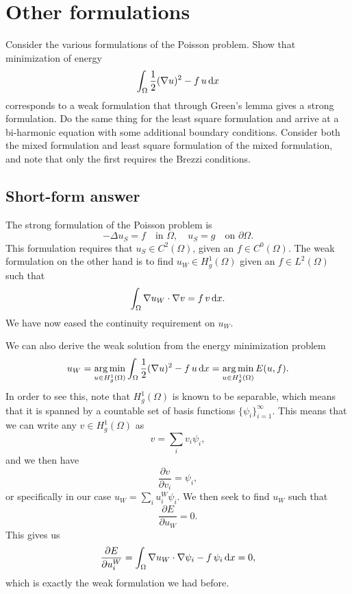 \section{Other formulations}
Consider the various formulations of the Poisson problem.
Show that minimization of energy
\begin{equation}
    \int_\Omega \frac{1}{2}(\nabla u)^2 - f \, u \mathop{}\!\mathrm{d} x
\end{equation}
corresponds to a weak formulation that through Green's lemma gives a strong formulation.
Do the same thing for the least square formulation and arrive at a bi-harmonic equation with some additional boundary conditions.
Consider both the mixed formulation and least square formulation of the mixed formulation, and note that only the first requires the Brezzi conditions.

\subsection{Short-form answer}
The strong formulation of the Poisson problem is
\begin{equation}
    -\Delta u_S = f \quad \text{in } \Omega,
    \quad u_S = g \quad \text{on } \partial\Omega.
\end{equation}
This formulation requires that $u_S \in C^2(\Omega)$, given an $f \in C^0(\Omega)$.
The weak formulation on the other hand is to find $u_W \in H^1_g(\Omega)$ given an $f \in L^2(\Omega)$ such that
\begin{equation}
    \int_\Omega \nabla u_W \cdot \nabla v = f \, v \mathop{}\!\mathrm{d} x.
\end{equation}
We have now eased the continuity requirement on $u_W$.

We can also derive the weak solution from the energy minimization problem
\begin{equation}
    u_W = \operatorname*{arg\,min}_{u \in H^1_g(\Omega)} \int_\Omega \frac{1}{2}(\nabla u)^2 - f \, u \mathop{}\!\mathrm{d} x = \operatorname*{arg\,min}_{u \in H^1_g(\Omega)} E(u, f).
\end{equation}
In order to see this, note that $H^1_g(\Omega)$ is known to be separable, which means that it is spanned by a countable set of basis functions $\{ \psi_i \}_{i = 1}^\infty$.
This means that we can write any $v \in H^1_g(\Omega)$ as
\begin{equation}
    v = \sum_i v_i \psi_i,
\end{equation}
and we then have
\begin{equation}
    \frac{\partial v}{\partial v_i} = \psi_i,
\end{equation}
or specifically in our case \( u_W = \sum_{i} u^W_i \psi_i \).
We then seek to find $u_W$ such that
\begin{equation}
    \frac{\partial E}{\partial u_W} = 0.
\end{equation}
This gives us
\begin{equation}
    \frac{\partial E}{\partial u_i^W} = \int_\Omega \nabla u_W \cdot \nabla \psi_i - f \, \psi_i \mathop{}\!\mathrm{d} x = 0,
\end{equation}
which is exactly the weak formulation we had before.

